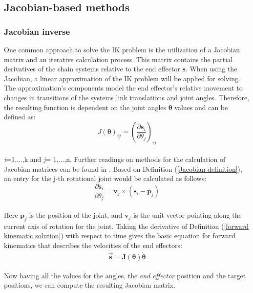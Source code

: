 \subsection{Jacobian-based methods}
\subsubsection{Jacobian inverse}
One common approach to solve the IK problem is the utilization of a Jacobian matrix and an iterative calculation process. This matrix contains the partial derivatives of the chain systems relative to the end effector \textbf{s}. When using the Jacobian, a linear approximation  of the IK problem will be applied for solving. The approximation's components model the end effector's relative movement to changes in transitions of the systems link translations and joint angles. Therefore, the resulting function is dependent on the joint angles $\pmb{\theta}$ values and can be defined as:\\
\begin{equation}
\label{Jacobian definition}
J(\pmb{\theta})_{ij}=\left(\frac{\partial\textbf{s}_{i}}{\partial\theta_{j}}\right)_{ij}
\end{equation}
\\ \textit{i}=1,...,k and \textit{j}= 1,...,n.
Further readings on methods for the calculation of Jacobian matrices can be found in \cite{Orin.1984}. Based on Definition (\ref{Jacobian definition}), an entry for the j-th rotational joint would be calculated as follows:\\
\begin{equation}
\label{Jacobian entry calc}
\frac{\partial \textbf{s}_{i}}{\partial \theta_{j}}= \textbf{v}_{j}\times(\textbf{s}_{i}-\textbf{p}_{j})
\end{equation}
\\Here $\textbf{p}_{j}$ is the position of the joint, and $\textbf{v}_{j}$ is the unit vector pointing along the current axis of rotation for the joint.
Taking the derivative of Definition (\ref{forward kinematic solution}) with respect to time gives the basic equation for forward kinematics that describes the velocities of the end effectors:
\begin{equation}
\label{fk derivate}
\dot{\vec{\pmb{s}}}=\pmb{J}\pmb{(\theta)}\dot{\pmb{\theta}}
\end{equation}
\\ Now having all the values for the angles, the \textit{end effector} position and the target positions, we can compute the resulting Jacobian matrix.
